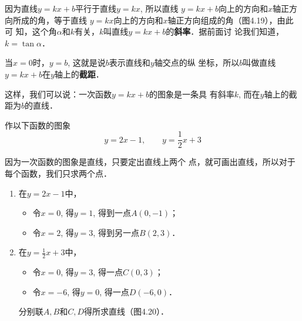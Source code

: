 因为直线$y=kx+b$平行于直线$y=kx$, 所以直线
$y=kx+b$向上的方向和$x$轴正方向所成的角，等于直线
$y=kx$向上的方向和$x$轴正方向组成的角（图4.19），由此可
知，这个角$\alpha$和$k$有关，$k$叫直线$y=kx+b$的\textbf{斜率}．据前面讨
论我们知道，$k=\tan \alpha$．

当$x=0$时，$y=b$, 这就是说$b$表示直线和$y$轴交点的纵
坐标，所以$b$叫做直线$y=kx+b$在$y$轴上的\textbf{截距}．

这样，我们可以说：一次函数$y=kx+b$的图象是一条具
有斜率$k$, 而在$y$轴上的截距为$b$的直线．

\begin{example}
作以下函数的图象
\[y=2x-1,\qquad y=\dfrac{1}{2}x+3\]
\end{example}

\begin{solution}
因为一次函数的图象是直线，只要定出直线上两个
点，就可画出直线，所以对于每个函数，我们只求两个点．
\begin{enumerate}
    \item 在$y=2x-1$中，
    \begin{itemize}
        \item 令$x=0$, 得$y=1$, 得到一点$A(0,-1)$；
        \item 令$x=2$, 得$y=3$, 得到另一点$B(2,3)$．
    \end{itemize}
    \item 在$y=\frac{1}{2}x+3$中，
\begin{itemize}
    \item 令$x=0$, 得$y=3$, 得一点$C(0,3)$；
    \item 令$x=-6$, 得$y=0$, 得一点$D(-6,0)$．
\end{itemize}
分别联$A,B$和$C,D$得所求直线（图4.20）．
\end{enumerate}

\begin{figure}[htp]
    \centering
{}    
    \caption{}
\end{figure}
\end{solution}

